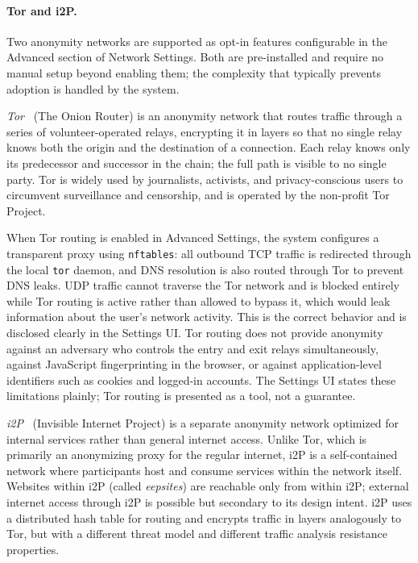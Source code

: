 \paragraph{Tor and i2P.}
Two anonymity networks are supported as opt-in features configurable in the
Advanced section of Network Settings. Both are pre-installed and require no
manual setup beyond enabling them; the complexity that typically prevents
adoption is handled by the system.

\emph{Tor}~\cite{tor} (The Onion Router) is an anonymity network that routes
traffic through a series of volunteer-operated relays, encrypting it in layers
so that no single relay knows both the origin and the destination of a
connection. Each relay knows only its predecessor and successor in the chain;
the full path is visible to no single party. Tor is widely used by journalists,
activists, and privacy-conscious users to circumvent surveillance and
censorship, and is operated by the non-profit Tor Project.

When Tor routing is enabled in Advanced Settings, the system configures a
transparent proxy using \texttt{nftables}: all outbound TCP traffic is
redirected through the local \texttt{tor} daemon, and DNS resolution is also
routed through Tor to prevent DNS leaks. UDP traffic cannot traverse the Tor
network and is blocked entirely while Tor routing is active rather than allowed
to bypass it, which would leak information about the user's network activity.
This is the correct behavior and is disclosed clearly in the Settings UI.
Tor routing does not provide anonymity against an adversary who controls the
entry and exit relays simultaneously, against JavaScript fingerprinting in
the browser, or against application-level identifiers such as cookies and
logged-in accounts. The Settings UI states these limitations plainly; Tor
routing is presented as a tool, not a guarantee.

\emph{i2P}~\cite{i2p} (Invisible Internet Project) is a separate anonymity
network optimized for internal services rather than general internet access.
Unlike Tor, which is primarily an anonymizing proxy for the regular internet,
i2P is a self-contained network where participants host and consume services
within the network itself. Websites within i2P (called \emph{eepsites}) are
reachable only from within i2P; external internet access through i2P is
possible but secondary to its design intent. i2P uses a distributed hash table
for routing and encrypts traffic in layers analogously to Tor, but with a
different threat model and different traffic analysis resistance properties.

